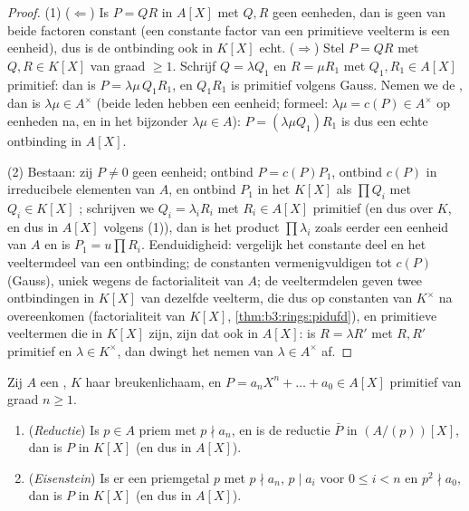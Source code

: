 \begin{proof}
(1) ($\Leftarrow$) Is $P = QR$ in $A[X]$ met $Q, R$ geen eenheden,
dan is geen van beide factoren constant (een constante factor van
een primitieve veelterm is een eenheid), dus is de ontbinding ook
in $K[X]$ echt. ($\Rightarrow$) Stel $P = QR$ met $Q, R \in K[X]$
van graad $\geq 1$. Schrijf $Q = \lambda Q_1$ en $R = \mu R_1$ met
$Q_1, R_1 \in A[X]$ primitief: dan is $P = \lambda\mu\, Q_1R_1$, en
$Q_1R_1$ is primitief volgens Gauss. Nemen we de , dan is
$\lambda\mu \in A^\times$ (beide leden hebben  een eenheid;
formeel: $\lambda\mu = c(P) \in A^\times$ op eenheden na, en in het
bijzonder $\lambda \mu \in A$): $P = (\lambda\mu Q_1) R_1$ is dus
een echte ontbinding in $A[X]$.

(2) Bestaan: zij $P \neq 0$ geen eenheid; ontbind $P = c(P)P_1$,
ontbind $c(P)$ in irreducibele elementen van $A$, en ontbind $P_1$
in het  $K[X]$ als $\prod Q_i$ met $Q_i \in K[X]$ ;
schrijven we $Q_i = \lambda_i R_i$ met $R_i \in A[X]$ primitief (en
dus  over $K$, en dus in $A[X]$ volgens (1)), dan is het
product $\prod \lambda_i$ zoals eerder een eenheid van $A$ en is
$P_1 = u\prod R_i$. Eenduidigheid: vergelijk het constante deel en
het veeltermdeel van een ontbinding; de constanten
vermenigvuldigen tot $c(P)$ (Gauss), uniek wegens de
factorialiteit van $A$; de veeltermdelen geven twee ontbindingen
in $K[X]$ van dezelfde veelterm, die dus op constanten van
$K^\times$ na overeenkomen (factorialiteit van $K[X]$,
\cref{thm:b3:rings:pidufd}), en primitieve veeltermen die in
$K[X]$  zijn, zijn dat ook in $A[X]$: is $R = \lambda
R'$ met $R, R'$ primitief en $\lambda \in K^\times$, dan dwingt het
nemen van  $\lambda \in A^\times$ af.
\end{proof}

\begin{theorem}[Irreducibiliteitscriteria]\label{thm:b3:rings:criteria}
Zij $A$ een , $K$ haar breukenlichaam, en $P = a_nX^n + \dots +
a_0 \in A[X]$ primitief van graad $n \geq 1$.
\begin{enumerate}
  \item (\emph{Reductie}) Is $p \in A$ priem met $p \nmid a_n$, en
        is de reductie $\bar P$  in $(A/(p))[X]$, dan is
        $P$  in $K[X]$ (en dus in $A[X]$).
  \item (\emph{Eisenstein}) Is er
        een priemgetal $p$ met $p \nmid a_n$, $p \mid a_i$ voor $0
        \leq i < n$ en $p^2 \nmid a_0$, dan is $P$  in
        $K[X]$ (en dus in $A[X]$).
\end{enumerate}
\end{theorem}

